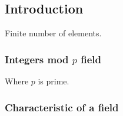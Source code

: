 
\subsection{Introduction}

Finite number of elements.

\subsubsection{Integers mod \(p\) field}

Where \(p\) is prime.

\subsubsection{Characteristic of a field}

